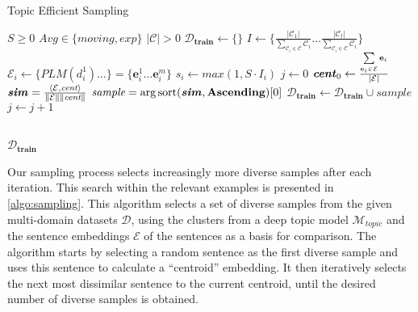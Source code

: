 \documentclass[11pt]{article}
\DeclareMathOperator*{\argsort}{arg\,sort}
\begin{document}
\begin{algorithm}
\caption{Topic Efficient Sampling}\label{algo:sampling}
\begin{algorithmic}
\Require $S \geq 0$  
\Require $\textit{Avg} \in \{\textit{moving}, \textit{exp} \}$
\Ensure $\lvert \mathcal{C} \rvert > 0$
\State $\mathcal{D}_{\textbf{train}} \gets \{\}$
\State $I \gets \{\frac{\lvert \mathcal{C}_1 \rvert}{\sum \limits_{\mathcal{C}_i \in \mathcal{C}} \mathcal{C}_i} \dots \frac{\lvert \mathcal{C}_t \rvert}{\sum \limits_{\mathcal{C}_i \in \mathcal{C}} \mathcal{C}_i} \}$ 
 
\State $\mathcal{E}_i \gets \{\textit{PLM}(d_i^1) \dots \} = \{\mathbf{e}_i^1 \dots \mathbf{e}_i^m \}$
\State $s_i \gets max(1,S \cdot I_i)$ 
\State $\textit{j} \gets 0$
\State $\textbf{\textit{cent}}_0 \gets \frac{\sum \limits_{\mathbf{e}_i \in \mathcal{E}} \mathbf{e}_i}{\lvert \mathcal{E} \rvert}$ 
\State $\textbf{\textit{sim}} = \frac{\langle\mathcal{E}, \textit{cent}\rangle}{\|\mathbf{\mathcal{E}}\|\|\textit{cent}\|}$ 
\State $\textit{sample}=\argsort (\textbf{\textit{sim}}, \textbf{Ascending})[0]$
\State $\mathcal{D}_\textbf{train} \gets \mathcal{D}_\textbf{train} \cup \textit{sample}$
\State $\textit{j} \gets \textit{j} + 1$
\State {}

\State {}

\EndWhile{}
\EndFor{}\\
\Return $\mathcal{D}_\textbf{train}$
\end{algorithmic}
\end{algorithm}


Our sampling process selects increasingly more diverse samples after each iteration. This search within the relevant examples is presented in \autoref{algo:sampling}.
This algorithm selects a set of diverse samples from the given multi-domain datasets $\mathcal{D}$, using the clusters from a deep topic model $\mathcal{M}_\textit{topic}$ and the sentence embeddings $\mathcal{E}$ of the sentences as a basis for comparison. The algorithm starts by selecting a random sentence as the first diverse sample and uses this sentence to calculate a ``centroid'' embedding. It then iteratively selects the next most dissimilar sentence to the current centroid, until the desired number of diverse samples is obtained.
\end{document}
